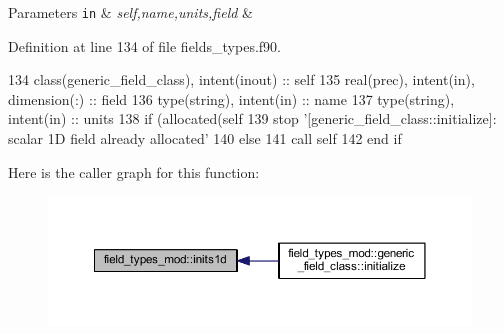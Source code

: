 \begin{DoxyParams}[1]{Parameters}
\mbox{\tt in}  & {\em self,name,units,field} & \\
\hline
\end{DoxyParams}


Definition at line 134 of file fields\+\_\+types.\+f90.


\begin{DoxyCode}
134     \textcolor{keywordtype}{class}(generic\_field\_class), \textcolor{keywordtype}{intent(inout)} :: self
135     \textcolor{keywordtype}{real(prec)}, \textcolor{keywordtype}{intent(in)}, \textcolor{keywordtype}{dimension(:)} :: field
136     \textcolor{keywordtype}{type}(string), \textcolor{keywordtype}{intent(in)} :: name
137     \textcolor{keywordtype}{type}(string), \textcolor{keywordtype}{intent(in)} :: units
138     \textcolor{keywordflow}{if} (\textcolor{keyword}{allocated}(self%
139         stop \textcolor{stringliteral}{'[generic\_field\_class::initialize]: scalar 1D field already allocated'}
140     \textcolor{keywordflow}{else}
141         \textcolor{keyword}{call }self%
142 \textcolor{keywordflow}{    end if}
\end{DoxyCode}
Here is the caller graph for this function\+:
\nopagebreak
\begin{figure}[H]
\begin{center}
\leavevmode
\includegraphics[width=350pt]{namespacefield__types__mod_ae4985a4f37aad76b5bd9d4fdbdec8ff3_icgraph}
\end{center}
\end{figure}
\mbox{\label{namespacefield__types__mod_a55a57c6fa8c785a5f529ca577a677845}} 
